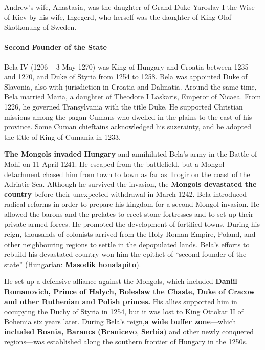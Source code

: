 Andrew's wife, Anastasia, was the daughter of Grand Duke Yaroslav I the Wise of Kiev by his wife, Ingegerd, who herself was the daughter of King Olof Skotkonung of Sweden.

\paragraph{Second Founder of the State}


Bela IV (1206 -- 3 May 1270) was King of Hungary and Croatia between 1235 and 1270, and Duke of Styria from 1254 to 1258. Bela was appointed Duke of Slavonia, also with jurisdiction in Croatia and Dalmatia. Around the same time, Bela married Maria, a daughter of Theodore I Laskaris, Emperor of Nicaea. From 1226, he governed Transylvania with the title Duke. He supported Christian missions among the pagan Cumans who dwelled in the plains to the east of his province. Some Cuman chieftains acknowledged his suzerainty, and he adopted the title of King of Cumania in 1233.

\textbf{The Mongols invaded Hungary} and annihilated Bela's army in the Battle of Mohi on 11 April 1241. He escaped from the battlefield, but a Mongol detachment chased him from town to town as far as Trogir on the coast of the Adriatic Sea. Although he survived the invasion, the \textbf{Mongols devastated the country} before their unexpected withdrawal in March 1242. Bela introduced radical reforms in order to prepare his kingdom for a second Mongol invasion. He allowed the barons and the prelates to erect stone fortresses and to set up their private armed forces. He promoted the development of fortified towns. During his reign, thousands of colonists arrived from the Holy Roman Empire, Poland, and other neighbouring regions to settle in the depopulated lands. Bela's efforts to rebuild his devastated country won him the epithet of ``second founder of the state'' (Hungarian: \textbf{Masodik honalapito}).

He set up a defensive alliance against the Mongols, which included \textbf{Daniil Romanovich, Prince of Halych, Boleslaw the Chaste, Duke of Cracow and other Ruthenian and Polish princes.} His allies supported him in occupying the Duchy of Styria in 1254, but it was lost to King Ottokar II of Bohemia six years later. During Bela's reign,\textbf{a wide buffer zone}---which \textbf{included Bosnia, Barancs (Branicevo}, \textbf{Serbia}) and other newly conquered regions---was established along the southern frontier of Hungary in the 1250s.

